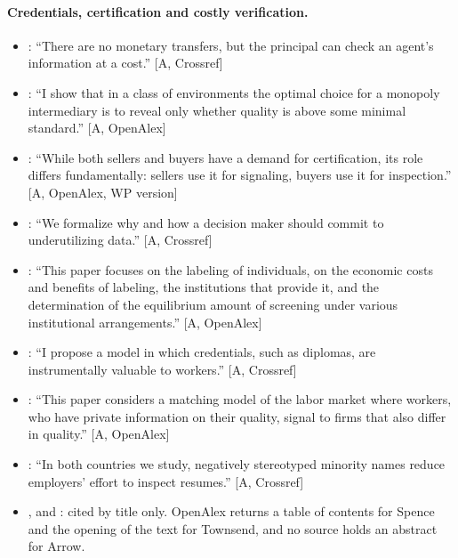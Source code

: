 \documentclass[11pt,a4paper]{article}
\newcommand{\aq}[2]{``#2''}
\begin{document}
\paragraph{Credentials, certification and costly verification.}
\begin{itemize}
\item \citet{BenPorathDekelLipman2014}: \aq{BenPorathDekelLipman2014}{There are no monetary transfers, but the principal can check an agent’s information at a cost.} [A, Crossref]
\item \citet{Lizzeri1999}: \aq{Lizzeri1999}{I show that in a class of environments the optimal choice for a monopoly intermediary is to reveal only whether quality is above some minimal standard.} [A, OpenAlex]
\item \citet{StahlStrausz2017WP}: \aq{StahlStrausz2017WP}{While both sellers and buyers have a demand for certification, its role differs fundamentally: sellers use it for signaling, buyers use it for inspection.} [A, OpenAlex, WP version]
\item \citet{FrankelKartik2022}: \aq{FrankelKartik2022}{We formalize why and how a decision maker should commit to underutilizing data.} [A, Crossref]
\item \citet{Stiglitz1975}: \aq{Stiglitz1975}{This paper focuses on the labeling of individuals, on the economic costs and benefits of labeling, the institutions that provide it, and the determination of the equilibrium amount of screening under various institutional arrangements.} [A, OpenAlex]
\item \citet{Bidner2014}: \aq{Bidner2014}{I propose a model in which credentials, such as diplomas, are instrumentally valuable to workers.} [A, Crossref]
\item \citet{Hopkins2012}: \aq{Hopkins2012}{This paper considers a matching model of the labor market where workers, who have private information on their quality, signal to firms that also differ in quality.} [A, OpenAlex]
\item \citet{BartosBauerChytilovaMatejka2016}: \aq{BartosBauerChytilovaMatejka2016}{In both countries we study, negatively stereotyped minority names reduce employers' effort to inspect resumes.} [A, Crossref]
\item \citet{Spence1973}, \citet{Arrow1973} and \citet{Townsend1979}: cited by
  title only. OpenAlex returns a table of contents for Spence and the opening
  of the text for Townsend, and no source holds an abstract for Arrow.
\end{itemize}
\end{document}
